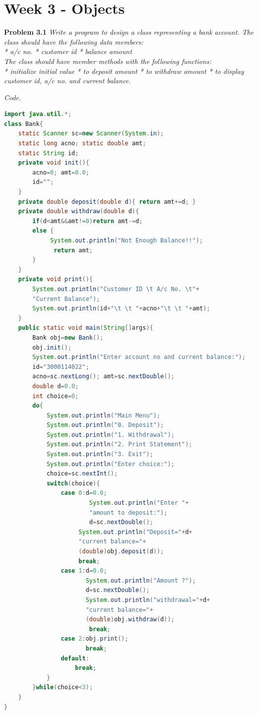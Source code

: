 \documentclass[12pt]{article}
\begin{document}
\section{Week 3 - Objects}

\textbf{Problem 3.1} \textit{Write a program to design a class representing a bank account. The class should have the following data members:\\
* a/c no. * customer id * balance amount\\
The class should have member methods with the following functions:\\
* initialize initial value
* to deposit amount
* to withdraw amount
* to display customer id, a/c no. and current balance.}


\textit{Code.}

\begin{lstlisting}[language=Java]
import java.util.*;
class Bank{
	static Scanner sc=new Scanner(System.in);
	static long acno; static double amt;
	static String id;
	private void init(){
		acno=0; amt=0.0;
		id="";
	}
	private double deposit(double d){ return amt+=d; }
	private double withdraw(double d){
		if(d<amt&&amt!=0)return amt-=d;
		else {
			 System.out.println("Not Enough Balance!!");
			  return amt;
		}
	}
	private void print(){
		System.out.println("Customer ID \t A/c No. \t"+
		"Current Balance");
		System.out.println(id+"\t \t "+acno+"\t \t "+amt);
	}
	public static void main(String[]args){
		Bank obj=new Bank();
		obj.init();
		System.out.println("Enter account no and current balance:");
		id="3000114022";
		acno=sc.nextLong(); amt=sc.nextDouble();
		double d=0.0;
		int choice=0;
		do{
			System.out.println("Main Menu");
			System.out.println("0. Deposit");
			System.out.println("1. Withdrawal");
			System.out.println("2. Print Statement");
			System.out.println("3. Exit");
			System.out.println("Enter choice:");
			choice=sc.nextInt();
			switch(choice){
				case 0:d=0.0;
				        System.out.println("Enter "+
				        "amount to deposit:");
				        d=sc.nextDouble();
					 System.out.println("Deposit="+d+
					 "current balance="+
					 (double)obj.deposit(d));
					 break;
				case 1:d=0.0;
				       System.out.println("Amount ?");
				       d=sc.nextDouble();
				       System.out.println("withdrawal="+d+
				       "current balance="+
				       (double)obj.withdraw(d));
				        break;
				case 2:obj.print();
				       break;
				default:
					break;
			}
		}while(choice<3);
	}
}

\end{lstlisting}
\end{document}
